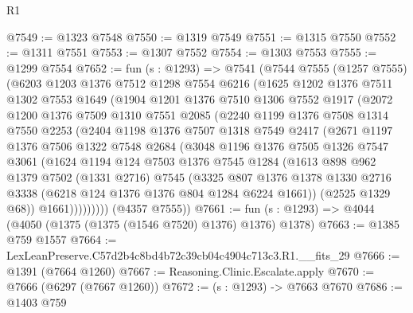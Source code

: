 \begin{lexlean}{R1}
\begin{coremodule}
@7549 := @1323 @7548
@7550 := @1319 @7549
@7551 := @1315 @7550
@7552 := @1311 @7551
@7553 := @1307 @7552
@7554 := @1303 @7553
@7555 := @1299 @7554
@7652 := fun (s : @1293) =>
  @7541
    (@7544
      @7555
      (@1257 @7555)
      (@6203
        @1203
        @1376
        @7512
        @1298
        @7554
        @6216
        (@1625
          @1202
          @1376
          @7511
          @1302
          @7553
          @1649
          (@1904
            @1201
            @1376
            @7510
            @1306
            @7552
            @1917
            (@2072
              @1200
              @1376
              @7509
              @1310
              @7551
              @2085
              (@2240
                @1199
                @1376
                @7508
                @1314
                @7550
                @2253
                (@2404
                  @1198
                  @1376
                  @7507
                  @1318
                  @7549
                  @2417
                  (@2671
                    @1197
                    @1376
                    @7506
                    @1322
                    @7548
                    @2684
                    (@3048
                      @1196
                      @1376
                      @7505
                      @1326
                      @7547
                      @3061
                      (@1624
                        @1194
                        @124
                        @7503
                        @1376
                        @7545
                        @1284
                        (@1613
                          @898
                          @962
                          @1379
                          @7502
                          (@1331 @2716)
                          @7545
                          (@3325
                            @807
                            @1376
                            @1378
                            @1330
                            @2716
                            @3338
                            (@6218 @124 @1376 @1376 @804 @1284 @6224 @1661))
                          (@2525 @1329 @68))
                        @1661)))))))))
      (@4357 @7555))
@7661 := fun (s : @1293) => @4044 (@4050 (@1375 (@1375 (@1546 @7520) @1376) @1376) @1378)
@7663 := @1385 @759 @1557
@7664 := LexLeanPreserve.C57d2b4c8bd4b72c39cb04c4904c713c3.R1.__fits_29
@7666 := @1391 (@7664 @1260)
@7667 := Reasoning.Clinic.Escalate.apply
@7670 := @7666 (@6297 (@7667 @1260))
@7672 := (s : @1293) -> @7663 @7670
@7686 := @1403
    @759

\end{coremodule}
\end{lexlean}

